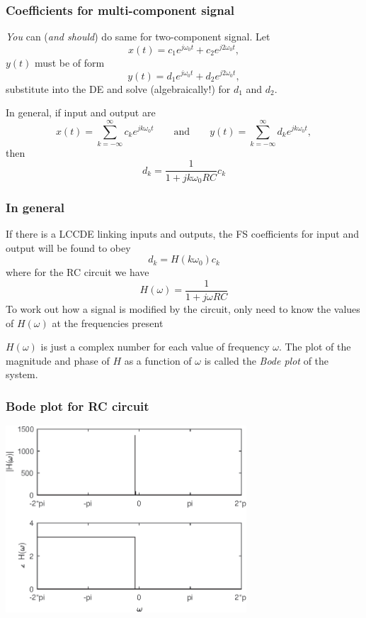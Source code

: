 \documentclass[10pt]{beamer}
\begin{document}
\begin{frame}
  \frametitle{Coefficients for multi-component signal}
  {\it You} can ({\it and should}) do same for two-component signal.  Let
  \begin{equation*}
    x(t)= c_1 e^{j \omega_0 t} + c_2 e^{j 2 \omega_0 t},
  \end{equation*}
  $y(t)$ must be of form
  \begin{equation*}
    y(t)= d_1 e^{j \omega_0 t} + d_2 e^{j 2 \omega_0 t},
  \end{equation*}
  substitute into the DE and solve (algebraically!) for $d_1$ and $d_2$.

  In general, if input and output are
  \begin{equation*}
    x(t) = \sum_{k=-\infty}^{\infty} c_k e^{j k \omega_0 t}
    \qquad \text{and} \qquad
    y(t) = \sum_{k=-\infty}^{\infty} d_k e^{j k \omega_0 t},
  \end{equation*}
  then
  \begin{equation*}
    d_k = \frac{1}{1 + j k \omega_0 RC} c_k
  \end{equation*}

\end{frame}

\begin{frame}
  \frametitle{In general}
  If there is a LCCDE linking inputs and outputs, the FS
  coefficients for input and output will be found to obey
  \begin{equation*}
    d_k = H(k \omega_0) c_k
  \end{equation*}
  where for the RC circuit we have
  \begin{equation*}
    H(\omega) = \frac{1}{1 + j \omega RC}
  \end{equation*}
  To work out how a signal is modified by the circuit, only need to
  know the values of $H(\omega)$ at the frequencies present

  $H(\omega)$ is just a complex number for each value of frequency
  $\omega$.  The plot of the magnitude and phase of $H$ as a
  function of $\omega$ is called the {\it Bode plot} of the
  system.
\end{frame}

\begin{frame}
  \frametitle{Bode plot for RC circuit}
  \begin{center}
    \includegraphics[width=9cm]{fs_rclpf_fig05}
  \end{center}
\end{frame}
\end{document}
